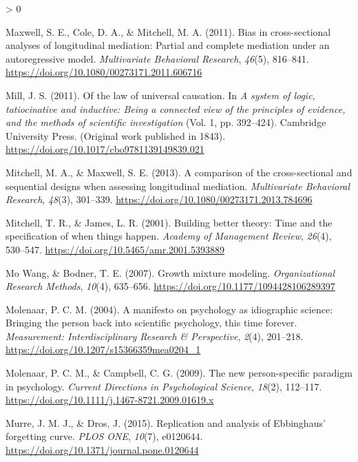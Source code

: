 \documentclass[
12pt, %
twoside,
english]{guelphthesis}
\newlength{\cslhangindent}
\newenvironment{CSLReferences}[2] %
 {%
  \setlength{\parindent}{0pt}
  \ifodd #1 \everypar{\setlength{\hangindent}{\cslhangindent}}\ignorespaces\fi
  \ifnum #2 > 0
  \setlength{\parskip}{\linespacing{2}}
  \fi
 }%
 {}
\begin{document}
\begin{CSLReferences}{1}{0}
\leavevmode{}%
Maxwell, S. E., Cole, D. A., \& Mitchell, M. A. (2011). Bias in cross-sectional analyses of longitudinal mediation: Partial and complete mediation under an autoregressive model. \emph{Multivariate Behavioral Research}, \emph{46}(5), 816--841. \url{https://doi.org/10.1080/00273171.2011.606716}

\leavevmode{}%
Mill, J. S. (2011). Of the law of universal causation. In \emph{A system of logic, tatiocinative and inductive: Being a connected view of the principles of evidence, and the methods of scientific investigation} (Vol. 1, pp. 392--424). Cambridge University Press. (Original work published in 1843). \url{https://doi.org/10.1017/cbo9781139149839.021}

\leavevmode{}%
Mitchell, M. A., \& Maxwell, S. E. (2013). A comparison of the cross-sectional and sequential designs when assessing longitudinal mediation. \emph{Multivariate Behavioral Research}, \emph{48}(3), 301--339. \url{https://doi.org/10.1080/00273171.2013.784696}

\leavevmode{}%
Mitchell, T. R., \& James, L. R. (2001). Building better theory: Time and the specification of when things happen. \emph{Academy of Management Review}, \emph{26}(4), 530--547. \url{https://doi.org/10.5465/amr.2001.5393889}

\leavevmode{}%
Mo Wang, \& Bodner, T. E. (2007). Growth mixture modeling. \emph{Organizational Research Methods}, \emph{10}(4), 635--656. \url{https://doi.org/10.1177/1094428106289397}

\leavevmode{}%
Molenaar, P. C. M. (2004). A manifesto on psychology as idiographic science: Bringing the person back into scientific psychology, this time forever. \emph{Measurement: Interdisciplinary Research \& Perspective}, \emph{2}(4), 201--218. \url{https://doi.org/10.1207/s15366359mea0204_1}

\leavevmode{}%
Molenaar, P. C. M., \& Campbell, C. G. (2009). The new person-specific paradigm in psychology. \emph{Current Directions in Psychological Science}, \emph{18}(2), 112--117. \url{https://doi.org/10.1111/j.1467-8721.2009.01619.x}

\leavevmode{}%
Murre, J. M. J., \& Dros, J. (2015). Replication and analysis of Ebbinghaus{'} forgetting curve. \emph{PLOS ONE}, \emph{10}(7), e0120644. \url{https://doi.org/10.1371/journal.pone.0120644}


\end{CSLReferences}
\end{document}
